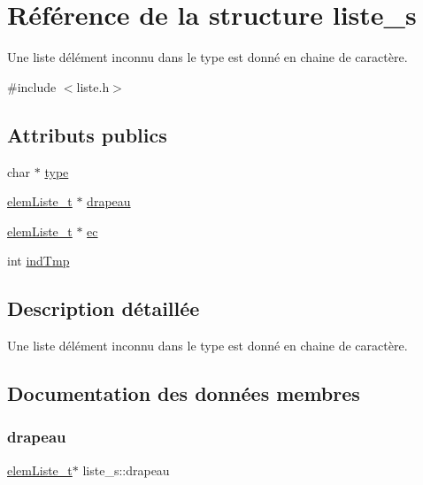 \hypertarget{structliste__s}{}\section{Référence de la structure liste\+\_\+s}
\label{structliste__s}


Une liste d\textquotesingle{}élément inconnu dans le type est donné en chaine de caractère.  




{\ttfamily \#include $<$liste.\+h$>$}

\subsection*{Attributs publics}
\begin{DoxyCompactItemize}
\item 
char $\ast$ \hyperlink{structliste__s_a85b56be0222a73dfde956aae220b6331}{type}
\item 
\hyperlink{structelem_liste__s}{elem\+Liste\+\_\+t} $\ast$ \hyperlink{structliste__s_aef9dbdf8c2c0370440b9bb9de250041a}{drapeau}
\item 
\hyperlink{structelem_liste__s}{elem\+Liste\+\_\+t} $\ast$ \hyperlink{structliste__s_a66e567f3f41e8e9a451ba207bbd93a3a}{ec}
\item 
int \hyperlink{structliste__s_a11df2a5f4a74043f0435b76ccdc24ba5}{ind\+Tmp}
\end{DoxyCompactItemize}


\subsection{Description détaillée}
Une liste d\textquotesingle{}élément inconnu dans le type est donné en chaine de caractère. 

\subsection{Documentation des données membres}
\mbox{\label{structliste__s_aef9dbdf8c2c0370440b9bb9de250041a}} 
\subsubsection{\texorpdfstring{drapeau}{drapeau}}
{\footnotesize\ttfamily \hyperlink{structelem_liste__s}{elem\+Liste\+\_\+t}$\ast$ liste\+\_\+s\+::drapeau}

